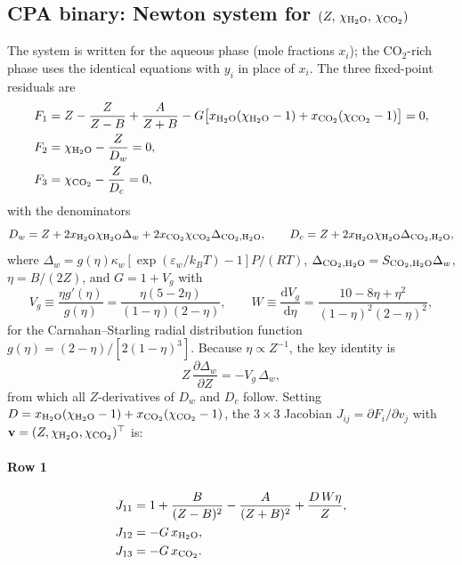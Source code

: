 \documentclass[preprint,12pt,number]{elsarticle}
\begin{document}
\subsection{CPA binary: Newton system for $(Z,\,\chi_{\rm H_2O},\,\chi_{\rm CO_2})$}
\label{sec:jac_cpa}

The system is written for the aqueous phase (mole fractions $x_i$); the CO$_2$-rich phase
uses the identical equations with $y_i$ in place of $x_i$.
The three fixed-point residuals are
\begin{align}
  F_1 &= Z - \frac{Z}{Z-B} + \frac{A}{Z+B}
         - G\bigl[x_{\rm H_2O}(\chi_{\rm H_2O}-1)+x_{\rm CO_2}(\chi_{\rm CO_2}-1)\bigr] = 0,
         \label{eq:F1jac} \\
  F_2 &= \chi_{\rm H_2O} - \frac{Z}{D_w} = 0,
         \label{eq:F2jac} \\
  F_3 &= \chi_{\rm CO_2} - \frac{Z}{D_c} = 0,
         \label{eq:F3jac}
\end{align}
with the denominators
\begin{equation}
  D_w = Z + 2x_{\rm H_2O}\chi_{\rm H_2O}\Delta_w + 2x_{\rm CO_2}\chi_{\rm CO_2}\Delta_{{\rm CO_2},{\rm H_2O}}, \qquad
  D_c = Z + 2x_{\rm H_2O}\chi_{\rm H_2O}\Delta_{{\rm CO_2},{\rm H_2O}},
  \label{eq:DwDc}
\end{equation}
where $\Delta_w = g(\eta)\kappa_w[\exp(\varepsilon_w/k_BT)-1]P/(RT)$,
$\Delta_{{\rm CO_2},{\rm H_2O}} = S_{{\rm CO_2},{\rm H_2O}}\Delta_w$, $\eta = B/(2Z)$,
and $G = 1 + V_g$ with
\begin{equation}
  V_g \equiv \frac{\eta g'(\eta)}{g(\eta)} = \frac{\eta(5-2\eta)}{(1-\eta)(2-\eta)}, \qquad
  W  \equiv \frac{\mathrm{d}V_g}{\mathrm{d}\eta} = \frac{10-8\eta+\eta^2}{(1-\eta)^2(2-\eta)^2},
  \label{eq:VgW}
\end{equation}
for the Carnahan--Starling radial distribution function
$g(\eta) = (2-\eta)/[2(1-\eta)^3]$.
Because $\eta \propto Z^{-1}$, the key identity is
\begin{equation}
  Z\,\frac{\partial\Delta_w}{\partial Z} = -V_g\,\Delta_w,
  \label{eq:dDeltadZ}
\end{equation}
from which all $Z$-derivatives of $D_w$ and $D_c$ follow.
Setting $D = x_{\rm H_2O}(\chi_{\rm H_2O}-1)+x_{\rm CO_2}(\chi_{\rm CO_2}-1)$, the $3\times 3$ Jacobian
$J_{ij} = \partial F_i/\partial v_j$ with $\mathbf{v}=(Z,\chi_{\rm H_2O},\chi_{\rm CO_2})^\top$ is:

\paragraph{Row 1}
\begin{align}
  J_{11} &= 1 + \frac{B}{(Z-B)^2} - \frac{A}{(Z+B)^2} + \frac{D\,W\eta}{Z},
             \label{eq:J11} \\
  J_{12} &= -G\,x_{\rm H_2O}, \label{eq:J12} \\
  J_{13} &= -G\,x_{\rm CO_2}. \label{eq:J13}
\end{align}
\end{document}
